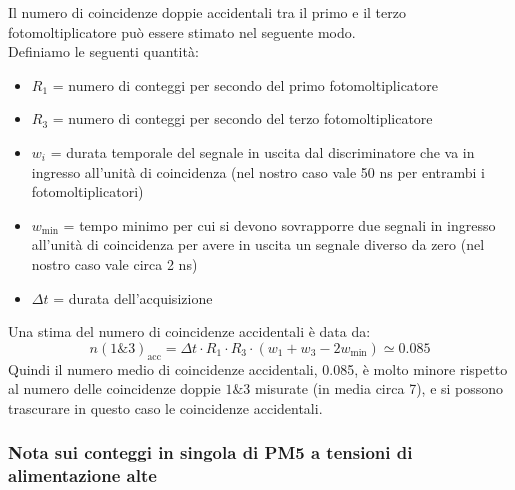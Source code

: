 \documentclass{article}
\begin{document}
Il numero di coincidenze doppie accidentali tra il primo e il terzo fotomoltiplicatore può essere stimato nel seguente modo. \\
Definiamo le seguenti quantità: 
\begin{itemize}
\item $R_1$ = numero di conteggi per secondo del primo fotomoltiplicatore
\item $R_3$ = numero di conteggi per secondo del terzo fotomoltiplicatore
\item $w_i$ = durata temporale del segnale in uscita dal discriminatore che va in ingresso all'unità di coincidenza (nel nostro caso vale 50 ns per entrambi i fotomoltiplicatori)
\item $w_{\text{min}}$ = tempo minimo per cui si devono sovrapporre due segnali in ingresso all'unità di coincidenza per avere in uscita un segnale diverso da zero (nel nostro caso vale circa 2 ns)
\item $\Delta t$ = durata dell'acquisizione
\end{itemize}
Una stima del numero di coincidenze accidentali è data da: 
\begin{equation}
\label{eq_accidental}
n(1\&3)_{\text{acc}} = \Delta t \cdot R_1 \cdot R_3 \cdot (w_1+w_3-2w_{\text{min}}) \simeq 0.085
\end{equation}
Quindi il numero medio di coincidenze accidentali, 0.085, è molto minore rispetto al numero delle coincidenze doppie $1\&3$ misurate (in media circa 7), e si possono trascurare in questo caso le coincidenze accidentali. 
\newpage
\subsubsection{Nota sui conteggi in singola di PM5 a tensioni di alimentazione alte}
\end{document}
